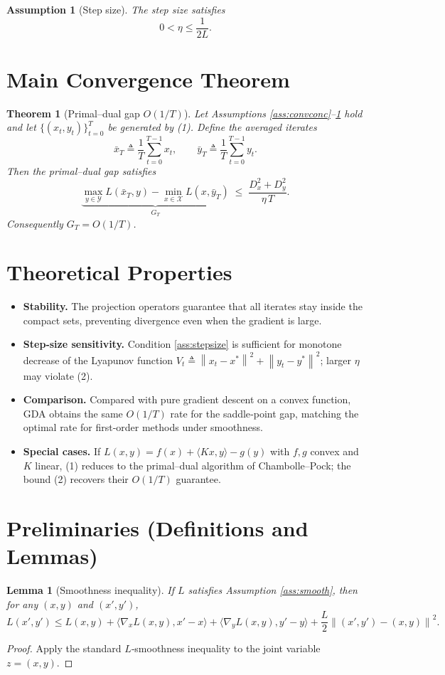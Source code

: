\documentclass{article}
\newcommand{\norm}[1]{\left\|#1\right\|}
\newtheorem{assumption}{Assumption}
\newtheorem{theorem}{Theorem}
\newtheorem{lemma}{Lemma}
\begin{document}
\begin{assumption}[Step size]\label{ass:stepsize}
The step size satisfies 
\[
0<\eta\le \frac{1}{2L}.
\]
\end{assumption}

\section*{Main Convergence Theorem}
\begin{theorem}[Primal–dual gap $O(1/T)$]\label{thm:convergence}
Let Assumptions \ref{ass:convconc}–\ref{ass:stepsize} hold and let $\{(x_t,y_t)\}_{t=0}^{T}$ be generated by (1).  
Define the averaged iterates
\[
\bar{x}_T\triangleq\frac{1}{T}\sum_{t=0}^{T-1}x_t,\qquad
\bar{y}_T\triangleq\frac{1}{T}\sum_{t=0}^{T-1}y_t .
\]
Then the primal–dual gap satisfies
\[
\underbrace{\max_{y\in\mathcal{Y}}L(\bar{x}_T,y)-\min_{x\in\mathcal{X}}L(x,\bar{y}_T)}_{\displaystyle G_T}
\;\le\; \frac{D_x^2+D_y^2}{\eta\,T}.
\tag{2}
\]
Consequently $G_T = O(1/T)$.
\end{theorem}

\section*{Theoretical Properties}
\begin{itemize}
\item \textbf{Stability.} The projection operators guarantee that all iterates stay inside the compact sets, preventing divergence even when the gradient is large.
\item \textbf{Step‑size sensitivity.} Condition \eqref{ass:stepsize} is sufficient for monotone decrease of the Lyapunov function $V_t\triangleq \norm{x_t-x^*}^2+\norm{y_t-y^*}^2$; larger $\eta$ may violate (2).
\item \textbf{Comparison.} Compared with pure gradient descent on a convex function, GDA obtains the same $O(1/T)$ rate for the saddle‑point gap, matching the optimal rate for first‑order methods under smoothness.
\item \textbf{Special cases.} If $L(x,y)=f(x)+\langle Kx,y\rangle-g(y)$ with $f,g$ convex and $K$ linear, (1) reduces to the primal–dual algorithm of Chambolle–Pock; the bound (2) recovers their $O(1/T)$ guarantee.
\end{itemize}

\section*{Preliminaries (Definitions and Lemmas)}
\begin{lemma}[Smoothness inequality]\label{lem:smooth}
If $L$ satisfies Assumption \ref{ass:smooth}, then for any $(x,y)$ and $(x',y')$,
\[
L(x',y')\le L(x,y)+\langle\nabla_x L(x,y),x'-x\rangle
+\langle\nabla_y L(x,y),y'-y\rangle
+\frac{L}{2}\norm{(x',y')-(x,y)}^2.
\tag{3}
\]
\end{lemma}
\begin{proof}
Apply the standard $L$‑smoothness inequality to the joint variable $z=(x,y)$.
\end{proof}
\end{document}
